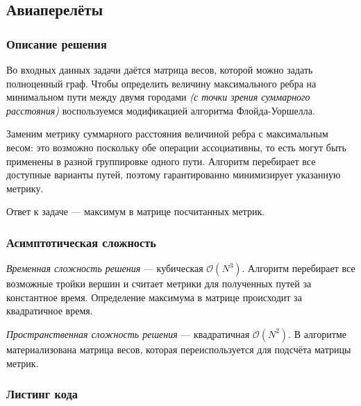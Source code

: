 \subsection{Авиаперелёты}

\subsubsection{Описание решения}

Во входных данных задачи даётся матрица весов, которой можно задать полноценный граф. Чтобы определить величину максимального ребра на минимальном пути между двумя городами \textit{(с точки зрения суммарного расстояния)} воспользуемся модификацией алгоритма Флойда-Уоршелла.

Заменим метрику суммарного расстояния величиной ребра с максимальным весом: это возможно поскольку обе операции ассоциативны, то есть могут быть применены в разной группировке одного пути. Алгоритм перебирает все доступные варианты путей, поэтому гарантированно минимизирует указанную метрику.

Ответ к задаче --- максимум в матрице посчитанных метрик.

\subsubsection{Асимптотическая сложность}

\textit{Временная сложность решения} --- кубическая \( \mathcal{O}(N^3) \). Алгоритм перебирает все возможные тройки вершин и считает метрики для полученных путей за константное время. Определение максимума в матрице происходит за квадратичное время.

\textit{Пространственная сложность решения} --- квадратичная \( \mathcal{O}(N^2) \). В алгоритме материализована матрица весов, которая переиспользуется для подсчёта матрицы метрик.

\subsubsection{Листинг кода}

